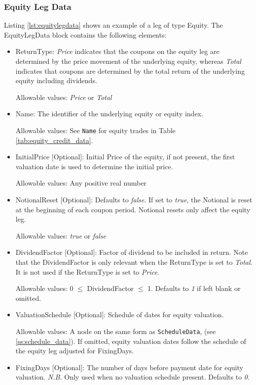 \subsubsection{Equity Leg Data}
\label{ss:equitylegdata}

Listing \ref{lst:equitylegdata} shows an example of a leg of type Equity. The EquityLegData block contains the following
elements:

\begin{itemize}
\item ReturnType: \emph{Price} indicates that the coupons on the equity leg are determined by the price movement of the underlying equity, whereas  \emph{Total} indicates that coupons are determined by the total return of the underlying equity including dividends.

Allowable values:  \emph{Price} or  \emph{Total}

\item Name: The identifier of the underlying equity or equity index.
 
 Allowable values: See \lstinline!Name! for equity trades in Table \ref{tab:equity_credit_data}. \\

\item InitialPrice [Optional]: Initial Price of the equity, if not present, the first valuation date is used to determine the initial price.

Allowable values: Any positive real number

\item NotionalReset [Optional]: Defaults to \emph{false}. If set to \emph{true}, the Notional is reset at the beginning of each coupon period. Notional resets only affect the equity leg.

Allowable values:  \emph{true} or  \emph{false}

\item DividendFactor [Optional]: Factor of dividend to be included in return. Note that the DividendFactor is only relevant when the ReturnType is set to  \emph{Total}. It is not used if the ReturnType is set to \emph{Price}.

Allowable values: 0 $\leq$ DividendFactor $\leq$  1.   Defaults to \emph{1} if left blank or omitted.

\item ValuationSchedule [Optional]: Schedule of dates for equity valuation.

Allowable values: A node on the same form as \lstinline!ScheduleData!, (see \ref{ss:schedule_data}). If omitted, equity valuation dates follow the schedule of the equity leg adjusted for FixingDays.

\item FixingDays [Optional]: The number of days before payment date for equity valuation. \emph{N.B.} Only used when no valuation schedule present. Defaults to \emph{0}.

\end{itemize} 

